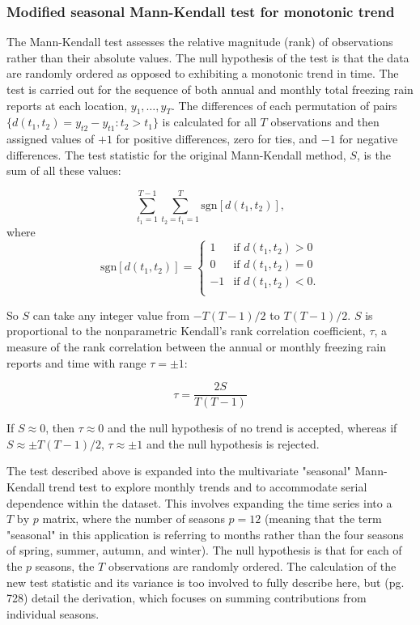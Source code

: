 \documentclass[twocol]{ametsoc}
\begin{document}
\subsubsection{Modified seasonal Mann-Kendall test for monotonic trend}
The Mann-Kendall test assesses the relative magnitude (rank) of observations rather than their absolute values. The null hypothesis of the test is that the data are randomly ordered as opposed to exhibiting a monotonic trend in time. The test is carried out for the sequence of both annual and monthly total freezing rain reports at each location, $y_1,\ldots,y_T$. The differences of each permutation of pairs $\{d(t_1,t_2)=y_{t2}-y_{t1}:t_2>t_1\}$ is calculated for all $T$ observations and then assigned values of $+1$ for positive differences, zero for ties, and $-1$ for negative differences. The test statistic for the original Mann-Kendall method, $S$, is the sum of all these values:

\[\sum_{t_1=1}^{T-1}\sum_{t_2=t_1=1}^T\text{sgn}[d(t_1,t_2)],\] where\\
\[\text{sgn}[d(t_1,t_2)]=\begin{cases} 1 & \text{if } d(t_1,t_2)>0\\ 0 & \text{if } d(t_1,t_2)=0\\ -1 & \text{if } d(t_1,t_2)<0.\\ \end{cases}\]

So $S$ can take any integer value from $-T(T-1)/2$ to $T(T-1)/2$. $S$ is proportional to the nonparametric Kendall's rank correlation coefficient, $\tau$, a measure of the rank correlation between the annual or monthly freezing rain reports and time with range $\tau=\pm1$:

\[\tau=\frac{2S}{T(T-1)}\]

If $S\approx0$, then $\tau\approx0$ and the null hypothesis of no trend is accepted, whereas if  $S\approx\pm T(T-1)/2$, $\tau\approx\pm1$ and the null hypothesis is rejected. 

The test described above is expanded into the multivariate "seasonal" Mann-Kendall trend test to explore monthly trends and to accommodate serial dependence within the dataset. This involves expanding the time series into a $T\text{ by }p$ matrix, where the number of seasons $p=12$ (meaning that the term "seasonal" in this application is referring to months rather than the four seasons of spring, summer, autumn, and winter). The null hypothesis is that for each of the $p$ seasons, the $T$ observations are randomly ordered. The calculation of the new test statistic and its variance is too involved to fully describe here, but \citet{hirsch1984nonparametric} (pg. 728) detail the derivation, which focuses on summing contributions from individual seasons.
\end{document}
